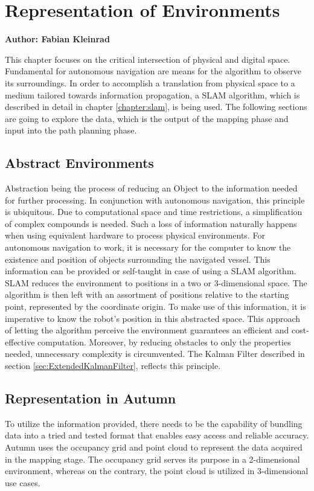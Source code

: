 \chapter{Representation of Environments}
\label{chapter:abstract_env}

\textbf{Author: Fabian Kleinrad} 

This chapter focuses on the critical intersection of physical and digital space. Fundamental for autonomous navigation are means for the algorithm to observe its surroundings. In order to accomplish a translation from physical space to a medium tailored towards information propagation, a SLAM algorithm, which is described in detail in chapter \ref{chapter:slam}, is being used. The following sections are going to explore the data, which is the output of the mapping phase and input into the path planning phase.

\section{Abstract Environments}

Abstraction being the process of reducing an Object to the information needed for further processing. In conjunction with autonomous navigation, this principle is ubiquitous. Due to computational space and time restrictions, a simplification of complex compounds is needed. Such a loss of information naturally happens when using equivalent hardware to process physical environments.\newline
For autonomous navigation to work, it is necessary for the computer to know the existence and position of objects surrounding the navigated vessel. This information can be provided or self-taught in case of using a SLAM algorithm. SLAM reduces the environment to positions in a two or 3-dimensional space. The algorithm is then left with an assortment of positions relative to the starting point, represented by the coordinate origin. To make use of this information, it is imperative to know the robot's position in this abstracted space.\newline
This approach of letting the algorithm perceive the environment guarantees an efficient and cost-effective computation. Moreover, by reducing obstacles to only the properties needed, unnecessary complexity is circumvented.      
The Kalman Filter described in section \ref{sec:ExtendedKalmanFilter}, reflects this principle.

\section{Representation in Autumn}
To utilize the information provided, there needs to be the capability of bundling data into a tried and tested format that enables easy access and reliable accuracy.\newline
Autumn uses the occupancy grid and point cloud to represent the data acquired in the mapping stage. The occupancy grid serves its purpose in a 2-dimensional environment, whereas on the contrary, the point cloud is utilized in 3-dimensional use cases.

